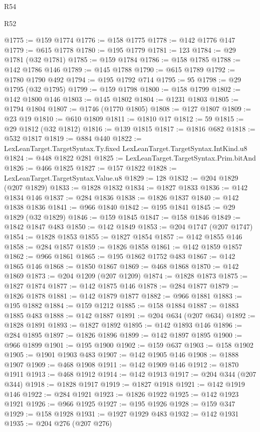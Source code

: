 \begin{lexlean}{R54}
\begin{lexlean}{R52}
\begin{coremodule}
{{{{{{{{{{{{{{{{{{{{{{{{{{{{{{{{{{{{{{{{{{{{{{{{{{{{{{{{{{{{{{{{{{{{{{{{{{{{{{{{{{{{{{{{{{{{{{{{{{{{{{{{{{{{{{{{{{{{{{{{{{{{{{{{{{{{{{{{{{{{{{{{{{{{{{{{{{{{{{{{{{{{{{{{{{{{{{{{{{{{{{{{{{{{{{{{{{{{{{@1775 := @159 @1774
@1776 := @158 @1775
@1778 := @142 @1776 @147
@1779 := @615 @1778
@1780 := @195 @1779
@1781 := 123
@1784 := @29 @1781 (@32 @1781)
@1785 := @159 @1784
@1786 := @158 @1785
@1788 := @142 @1786 @146
@1789 := @145 @1788
@1790 := @615 @1789
@1792 := @1780 @1790 @492
@1794 := @195 @1792 @714
@1795 := 95
@1798 := @29 @1795 (@32 @1795)
@1799 := @159 @1798
@1800 := @158 @1799
@1802 := @142 @1800 @146
@1803 := @145 @1802
@1804 := @1231 @1803
@1805 := @1794 @1804
@1807 := @1746 (@1770 @1805)
@1808 := @127 @1807
@1809 := @23 @19
@1810 := @610 @1809
@1811 := @1810 @17
@1812 := 59
@1815 := @29 @1812 (@32 @1812)
@1816 := @139 @1815
@1817 := @1816 @682
@1818 := @532 @1817
@1819 := @884 @440
@1822 := LexLeanTarget.TargetSyntax.Ty.fixed LexLeanTarget.TargetSyntax.IntKind.u8
@1824 := @448 @1822 @281
@1825 := LexLeanTarget.TargetSyntax.Prim.bitAnd
@1826 := @466 @1825
@1827 := @157 @1822
@1828 := LexLeanTarget.TargetSyntax.Value.u8
@1829 := 128
@1832 := @204 @1829 (@207 @1829)
@1833 := @1828 @1832
@1834 := @1827 @1833
@1836 := @142 @1834 @146
@1837 := @284 @1836
@1838 := @1826 @1837
@1840 := @142 @1838 @1836
@1841 := @966 @1840
@1842 := @195 @1841
@1845 := @29 @1829 (@32 @1829)
@1846 := @159 @1845
@1847 := @158 @1846
@1849 := @1842 @1847 @483
@1850 := @142 @1849
@1853 := @204 @1747 (@207 @1747)
@1854 := @1828 @1853
@1855 := @1827 @1854
@1857 := @142 @1855 @146
@1858 := @284 @1857
@1859 := @1826 @1858
@1861 := @142 @1859 @1857
@1862 := @966 @1861
@1865 := @195 @1862 @1752 @483
@1867 := @142 @1865 @146
@1868 := @1850 @1867
@1869 := @468 @1868
@1870 := @142 @1869
@1873 := @204 @1209 (@207 @1209)
@1874 := @1828 @1873
@1875 := @1827 @1874
@1877 := @142 @1875 @146
@1878 := @284 @1877
@1879 := @1826 @1878
@1881 := @142 @1879 @1877
@1882 := @966 @1881
@1883 := @195 @1882
@1884 := @159 @1212
@1885 := @158 @1884
@1887 := @1883 @1885 @483
@1888 := @142 @1887
@1891 := @204 @634 (@207 @634)
@1892 := @1828 @1891
@1893 := @1827 @1892
@1895 := @142 @1893 @146
@1896 := @284 @1895
@1897 := @1826 @1896
@1899 := @142 @1897 @1895
@1900 := @966 @1899
@1901 := @195 @1900
@1902 := @159 @637
@1903 := @158 @1902
@1905 := @1901 @1903 @483
@1907 := @142 @1905 @146
@1908 := @1888 @1907
@1909 := @468 @1908
@1911 := @142 @1909 @146
@1912 := @1870 @1911
@1913 := @468 @1912
@1914 := @142 @1913
@1917 := @204 @344 (@207 @344)
@1918 := @1828 @1917
@1919 := @1827 @1918
@1921 := @142 @1919 @146
@1922 := @284 @1921
@1923 := @1826 @1922
@1925 := @142 @1923 @1921
@1926 := @966 @1925
@1927 := @195 @1926
@1928 := @159 @347
@1929 := @158 @1928
@1931 := @1927 @1929 @483
@1932 := @142 @1931
@1935 := @204 @276 (@207 @276)
}}}}}}}}}}}}}}}}}}}}}}}}}}}}}}}}}}}}}}}}}}}}}}}}}}}}}}}}}}}}}}}}}}}}}}}}}}}}}}}}}}}}}}}}}}}}}}}}}}}}}}}}}}}}}}}}}}}}}}}}}}}}}}}}}}}}}}}}}}}}}}}}}}}}}}}}}}}}}}}}}}}}}}}}}}}}}}}}}}}}}}}}}}}}}}}}}}}}}}
\end{coremodule}
\end{lexlean}
\end{lexlean}
